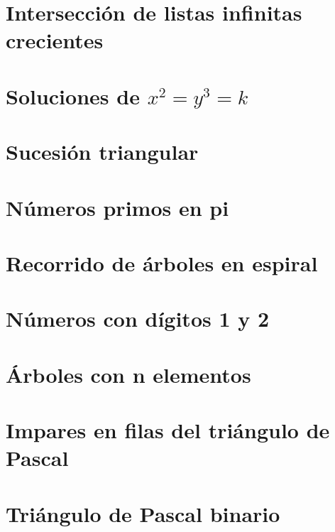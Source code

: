 \documentclass[a4paper,12pt,twoside]{book}
\begin{document}
\chapter{Intersección de listas infinitas crecientes}
\label{190121}

\chapter{Soluciones de \(x^2 = y^3 = k\)}
\label{190122}

\chapter{Sucesión triangular}
\label{190123}

\chapter{Números primos en pi}
\label{190124}

\chapter{Recorrido de árboles en espiral}
\label{190125}


\chapter{Números con dígitos 1 y 2}
\label{190128}

\chapter{Árboles con n elementos}
\label{190129}

\chapter{Impares en filas del triángulo de Pascal}
\label{190130}

\chapter{Triángulo de Pascal binario}
\label{190131}
\end{document}
